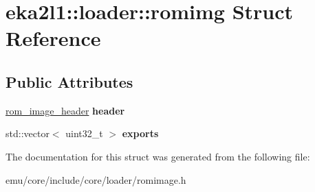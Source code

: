 \hypertarget{structeka2l1_1_1loader_1_1romimg}{}\section{eka2l1\+:\+:loader\+:\+:romimg Struct Reference}
\label{structeka2l1_1_1loader_1_1romimg}
\subsection*{Public Attributes}
\begin{DoxyCompactItemize}
\item 
\mbox{\label{structeka2l1_1_1loader_1_1romimg_a71eee462ff5b68e95346c1dba1e629b5}} 
\mbox{\hyperlink{structeka2l1_1_1loader_1_1rom__image__header}{rom\+\_\+image\+\_\+header}} {\bfseries header}
\item 
\mbox{\label{structeka2l1_1_1loader_1_1romimg_a578bd318b1b0addc9a1570b37d23940d}} 
std\+::vector$<$ uint32\+\_\+t $>$ {\bfseries exports}
\end{DoxyCompactItemize}


The documentation for this struct was generated from the following file\+:\begin{DoxyCompactItemize}
\item 
emu/core/include/core/loader/romimage.\+h\end{DoxyCompactItemize}
